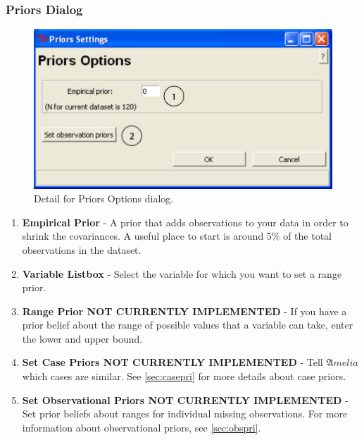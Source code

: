 \documentclass[12pt,titlepage]{article}
\begin{document}
\subsubsection{Priors Dialog}
\label{sec:pridiag}
\begin{figure}[ht]
  \centering
  \includegraphics[scale=.75]{priors}
  \caption{Detail for Priors Options dialog.}
\end{figure}
\begin{enumerate}
\item \textbf{Empirical Prior} - A prior that adds observations to your data in order to shrink the covariances.  A useful place to start is around 5\% of the total observations in the dataset.
\item \textbf{Variable Listbox} - Select the variable for which you want to set a range prior.
\item \textbf{Range Prior \textbf{NOT CURRENTLY IMPLEMENTED}} - If you have a prior belief about the range of possible values that a variable can take, enter the lower and upper bound.
\item \textbf{Set Case Priors \textbf{NOT CURRENTLY IMPLEMENTED}} -  Tell ${\mathfrak Amelia}$ which cases are similar.  See \ref{sec:casepri} for more details about case priors.
\item \textbf{Set Observational Priors \textbf{NOT CURRENTLY IMPLEMENTED}} - Set prior beliefs about ranges for individual missing observations.   For more information about observational priors, see \ref{sec:obspri}.
\end{enumerate}
\end{document}
